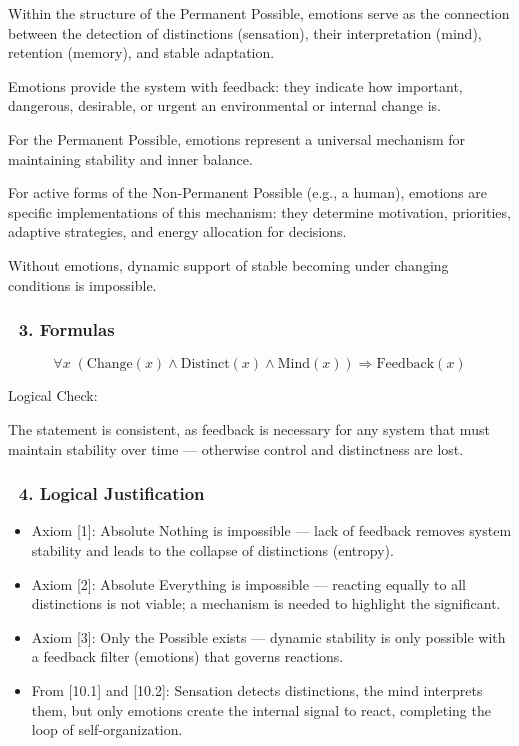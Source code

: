 \documentclass[12pt]{article}
\begin{document}
Within the structure of the Permanent Possible, emotions serve as the connection between the detection of distinctions (sensation), their interpretation (mind), retention (memory), and stable adaptation.

Emotions provide the system with feedback: they indicate how important, dangerous, desirable, or urgent an environmental or internal change is.

For the Permanent Possible, emotions represent a universal mechanism for maintaining stability and inner balance.

For active forms of the Non-Permanent Possible (e.g., a human), emotions are specific implementations of this mechanism: they determine motivation, priorities, adaptive strategies, and energy allocation for decisions.

Without emotions, dynamic support of stable becoming under changing conditions is impossible.

\subsubsection*{🔹 3. Formulas}

\[
\forall x \; (\text{Change}(x) \land \text{Distinct}(x) \land \text{Mind}(x)) \Rightarrow \text{Feedback}(x)
\]

Logical Check:

The statement is consistent, as feedback is necessary for any system that must maintain stability over time — otherwise control and distinctness are lost.

\subsubsection*{🔹 4. Logical Justification}

\begin{itemize}
\item Axiom [1]: Absolute Nothing is impossible — lack of feedback removes system stability and leads to the collapse of distinctions (entropy).
\item Axiom [2]: Absolute Everything is impossible — reacting equally to all distinctions is not viable; a mechanism is needed to highlight the significant.
\item Axiom [3]: Only the Possible exists — dynamic stability is only possible with a feedback filter (emotions) that governs reactions.
\item From [10.1] and [10.2]: Sensation detects distinctions, the mind interprets them, but only emotions create the internal signal to react, completing the loop of self-organization.
\end{itemize}
\end{document}
